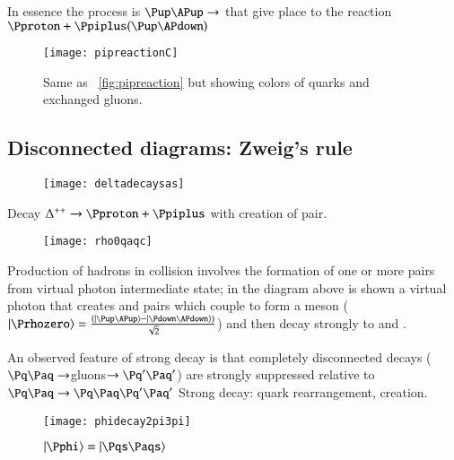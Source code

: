 \documentclass[main.tex]{subfiles}
\begin{document}
In essence the process is $\Pup\APup\rightarrow$\lbt{\Pup\APup}{\Pqs\Paqs} that give place to the reaction  $\Pproton+\Ppiplus(\Pup\APdown)$\lbt{\Delta^{++}(\Pup\Pup\Pup)+\Ppizero(\APup\Pup)}{\PSigmaplus(\Pup\Pup\Pqs)+\PKplus(\Paqs\Pup)}

\begin{figure}[!ht]
\centering
\texttt{[image: pipreactionC]}
\caption{Same as ~\ref{fig:pipreaction} but showing colors of quarks and exchanged gluons.}
\label{fig:pipreactionC}
\end{figure}

\clearpage

\subsection{Disconnected diagrams: Zweig's rule}

\begin{figure}[!ht]
\centering
\texttt{[image: deltadecaysas]}
\caption{}
\label{fig:deltadecaysas}
\end{figure}

Decay $\Delta^{++}\rightarrow\Pproton+\Ppiplus$ with creation of \Pdown\APdown pair.

\begin{figure}[!ht]
\centering
\texttt{[image: rho0qaqc]}
\caption{}
\label{fig:rho0qaqc}
\end{figure}

Production of hadrons in \Pelectron\APelectron collision involves the formation of one or more \Pq\Paq pairs from virtual photon intermediate state; in the diagram above is shown a virtual photon that creates  \Pup\APup and \Pdown\APdown pairs which couple to form a \Prhozero meson ($\ket{\Prhozero}=\frac{(\ket{\Pup\APup}-\ket{\Pdown\APdown})}{\sqrt{2}}$) and then decay strongly to \Ppiplus and \Ppiminus.

An observed feature of strong decay is that completely disconnected \Pq\Paq decays ($\Pq\Paq\rightarrow$gluons$\rightarrow\Pq'\Paq'$) are strongly suppressed relative to $\Pq\Paq\rightarrow\Pq\Paq\Pq'\Paq'$
Strong decay: quark rearrangement, \Pq\Paq creation.

\begin{figure}[!ht]
\centering
\texttt{[image: phidecay2pi3pi]}
\caption{$\ket{\Pphi}=\ket{\Pqs\Paqs}$}
\label{fig:phidecay2pi3pi}
\end{figure}
\end{document}
